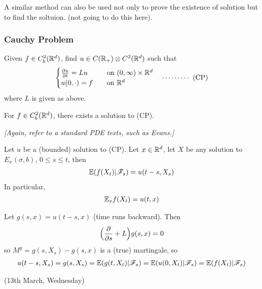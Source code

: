 \documentclass[10pt,a4paper]{article}
\newenvironment{proof}
{\begin{changemargin}{0.5cm}{0.5cm} 
	}%
	{\end{changemargin}
}
\newenvironment{p}
{\begin{proof} 
	}%
	{\end{proof}
}
\begin{document}
A similar method can also be used not only to prove the existence of solution but to find the soltuion. (not going to do this here).
\s

\subsubsection*{Cauchy Problem}

Given $f\in C_b^2(\mathbb{R}^d)$, find $u\in C(\mathbb{R}_+) \otimes C^2(\mathbb{R}^d)$ such that
\begin{align*}
\begin{cases}
\frac{\partial u}{\partial t} = Lu \quad & \text{on } (0, \infty) \times \mathbb{R}^d \\
u(0, \cdot) =f \quad & \text{on }\mathbb{R}^d
\end{cases} \quad \cdots\cdots\cdots\,\,(\text{CP})
\end{align*}
where $L$ is given as above.
\s

\thm For $f\in C_b^2(\mathbb{R}^d)$, there exists a solution to (CP).

\emph{[Again, refer to a standard PDE texts, such as Evans.]}
\s

\thm Let $u$ be a (bounded) solution to (CP). Let $x\in \mathbb{R}^d$, let $X$ be any solution to $E_x(\sigma, b)$, $0\leq s\leq t$, then
\begin{align*}
\mathbb{E}(f(X_t ) | \mathscr{F}_s) = u(t-s, X_s)
\end{align*}
In particular,
\begin{align*}
\mathbb{E}_x f(X_t) = u(t, x)
\end{align*}
\begin{p}
\pf Let $g(s, x) = u(t-s, x)$ (time runs backward). Then
\begin{align*}
\Big(\frac{\partial}{\partial s} + L \Big) g(s, x) = 0
\end{align*}
so $M^g = g(s, X_s) - g(s,x)$ is a (true) martingale, so
\begin{align*}
u(t-s, X_s) = g(s, X_s) = \mathbb{E} (g(t, X_t) | \mathscr{F}_s )= \mathbb{E} (u(0, X_t) | \mathscr{F}_s) = \mathbb{E}(f(X_t)| \mathscr{F}_s)
\end{align*}
\eop
\end{p}
\s
\s

\newday

(13th March, Wednesday)
\s
\end{document}
